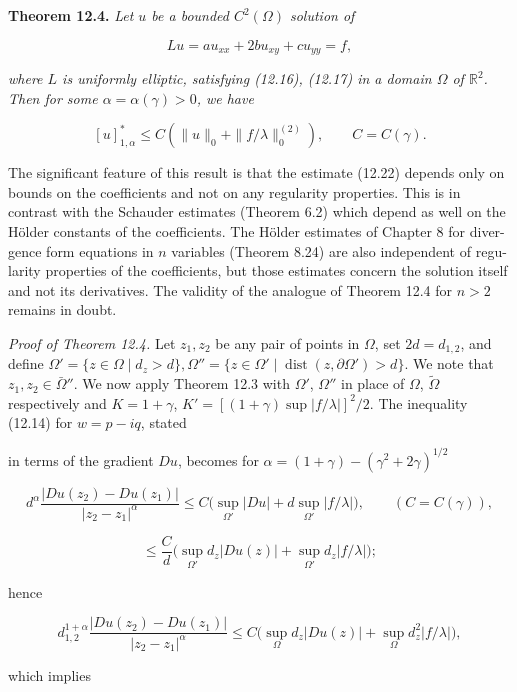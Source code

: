 \textbf{Theorem 12.4.} \emph{Let $u$ be a bounded $C^2(\Omega)$ solution of}

$$
Lu=au_{xx}+2bu_{xy}+cu_{yy}=f,
$$

\emph{where $L$ is uniformly elliptic, satisfying (12.16), (12.17) in a domain $\Omega$ of $\mathbb{R}^2$. Then
for some $\alpha=\alpha(\gamma)>0$, we have}

\begin{equation}
\tag{12.22}
[u]^*_{1,\alpha}\le C(\|u\|_0+\|f/\lambda\|_0^{(2)}), \qquad C=C(\gamma).
\end{equation}

The significant feature of this result is that the estimate (12.22) depends only
on bounds on the coefficients and not on any regularity properties. This is in
contrast with the Schauder estimates (Theorem 6.2) which depend as well on the
Hölder constants of the coefficients. The Hölder estimates of Chapter 8 for diver-
gence form equations in $n$ variables (Theorem 8.24) are also independent of regu-
larity properties of the coefficients, but those estimates concern the solution itself
and not its derivatives. The validity of the analogue of Theorem 12.4 for $n>2$
remains in doubt.

\emph{Proof of Theorem 12.4.} Let $z_1, z_2$ be any pair of points in $\Omega$, set $2d=d_{1,2}$, and
define $\Omega'=\{z\in\Omega\mid d_z>d\}, \Omega''=\{z\in\Omega' \mid \operatorname{dist}(z,\partial\Omega')>d\}$. We note that $z_1, z_2\in\bar{\Omega}''$.
We now apply Theorem 12.3 with $\Omega'$, $\Omega''$ in place of $\Omega$, $\tilde{\Omega}$ respectively and
$K=1+\gamma$, $K'=[(1+\gamma)\sup |f/\lambda|]^2/2$. The inequality (12.14) for $w=p-iq$, stated


in terms of the gradient $Du$, becomes for $\alpha = (1+\gamma) - (\gamma^2 + 2\gamma)^{1/2}$

\[
d^\alpha \frac{|Du(z_2) - Du(z_1)|}{|z_2 - z_1|^\alpha} \le C\bigl(\sup_{\Omega'} |Du| + d \sup_{\Omega'} |f/\lambda|\bigr), \qquad (C = C(\gamma)),
\]

\[
\le \frac{C}{d}\bigl(\sup_{\Omega'} d_z |Du(z)| + \sup_{\Omega'} d_z |f/\lambda|\bigr);
\]

hence

\[
d_{1,2}^{1+\alpha} \frac{|Du(z_2) - Du(z_1)|}{|z_2 - z_1|^\alpha} \le C\bigl(\sup_{\Omega} d_z |Du(z)| + \sup_{\Omega} d_z^2 |f/\lambda|\bigr),
\]

which implies

